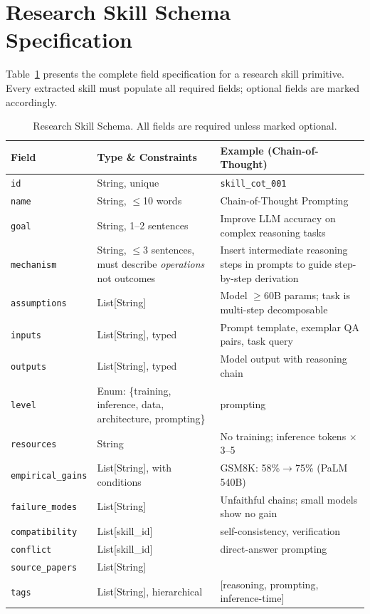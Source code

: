 \section{Research Skill Schema Specification}
\label{app:schema}

Table~\ref{tab:skill_schema} presents the complete field specification for a research skill primitive. Every extracted skill must populate all required fields; optional fields are marked accordingly.

\begin{table}[h]
\centering
\caption{Research Skill Schema. All fields are required unless marked optional.}
\label{tab:skill_schema}
\small
\begin{tabular}{@{}lp{5cm}p{5cm}@{}}
\toprule
\textbf{Field} & \textbf{Type \& Constraints} & \textbf{Example (Chain-of-Thought)} \\
\midrule
\texttt{id} & String, unique & \texttt{skill\_cot\_001} \\
\texttt{name} & String, $\leq$10 words & Chain-of-Thought Prompting \\
\texttt{goal} & String, 1--2 sentences & Improve LLM accuracy on complex reasoning tasks \\
\texttt{mechanism} & String, $\leq$3 sentences, must describe \emph{operations} not outcomes & Insert intermediate reasoning steps in prompts to guide step-by-step derivation \\
\texttt{assumptions} & List[String] & Model $\geq$60B params; task is multi-step decomposable \\
\texttt{inputs} & List[String], typed & Prompt template, exemplar QA pairs, task query \\
\texttt{outputs} & List[String], typed & Model output with reasoning chain \\
\texttt{level} & Enum: \{training, inference, data, architecture, prompting\} & prompting \\
\texttt{resources} & String & No training; inference tokens $\times$3--5 \\
\texttt{empirical\_gains} & List[String], with conditions & GSM8K: 58\%$\to$75\% (PaLM 540B) \\
\texttt{failure\_modes} & List[String] & Unfaithful chains; small models show no gain \\
\texttt{compatibility} & List[skill\_id] & self-consistency, verification \\
\texttt{conflict} & List[skill\_id] & direct-answer prompting \\
\texttt{source\_papers} & List[String] & \cite{wei2022chain} \\
\texttt{tags} & List[String], hierarchical & [reasoning, prompting, inference-time] \\
\bottomrule
\end{tabular}
\end{table}

